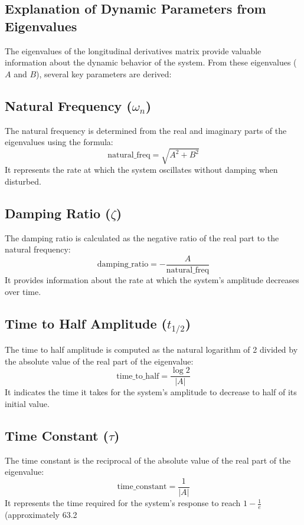 \documentclass[a4paper, twoside]{article}
\begin{document}
\subsection{Explanation of Dynamic Parameters from Eigenvalues}

The eigenvalues of the longitudinal derivatives matrix provide valuable information about the dynamic behavior of the system. From these eigenvalues (\(A\) and \(B\)), several key parameters are derived:

\subsection*{Natural Frequency (\(\omega_n\))}

The natural frequency is determined from the real and imaginary parts of the eigenvalues using the formula:
\[ \text{natural\_freq} = \sqrt{A^2 + B^2} \]
It represents the rate at which the system oscillates without damping when disturbed.

\subsection*{Damping Ratio (\(\zeta\))}

The damping ratio is calculated as the negative ratio of the real part to the natural frequency:
\[ \text{damping\_ratio} = -\frac{A}{\text{natural\_freq}} \]
It provides information about the rate at which the system's amplitude decreases over time.

\subsection*{Time to Half Amplitude (\(t_{1/2}\))}

The time to half amplitude is computed as the natural logarithm of 2 divided by the absolute value of the real part of the eigenvalue:
\[ \text{time\_to\_half} = \frac{\log{2}}{\left|A\right|} \]
It indicates the time it takes for the system's amplitude to decrease to half of its initial value.

\subsection*{Time Constant (\(\tau\))}

The time constant is the reciprocal of the absolute value of the real part of the eigenvalue:
\[ \text{time\_constant} = \frac{1}{\left|A\right|} \]
It represents the time required for the system's response to reach \(1 - \frac{1}{e}\) (approximately 63.2%
\end{document}
